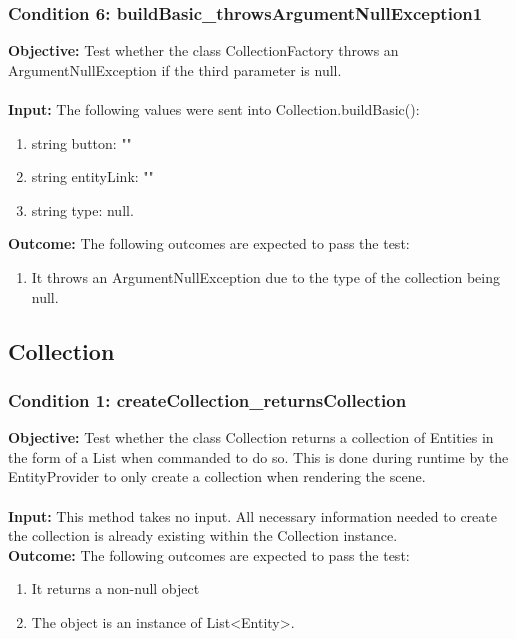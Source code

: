 \documentclass[a4paper,12pt]{article}
\begin{document}
		\subsubsection{Condition 6: buildBasic\_throwsArgumentNullException1}
			\textbf{Objective:} Test whether the class CollectionFactory throws an ArgumentNullException if the third parameter is null.\\\\
			\textbf{Input:} The following values were sent into Collection.buildBasic():
				\begin{enumerate}
					\item string button: ""
					\item string entityLink: ""
					\item string type: null.\\
				\end{enumerate}
			\textbf{Outcome:} The following outcomes are expected to pass the test:
				\begin{enumerate}
					\item It throws an ArgumentNullException due to the type of the collection being null.
				\end{enumerate}
	\subsection{Collection}
		\subsubsection{Condition 1: createCollection\_returnsCollection}
			\textbf{Objective:} Test whether the class Collection returns a collection of Entities in the form of a List when commanded to do so. This is done during runtime by the EntityProvider to only create a collection when rendering the scene.\\\\
			\textbf{Input:} This method takes no input. All necessary information needed to create the collection is already existing within the Collection instance.\\
			\textbf{Outcome:} The following outcomes are expected to pass the test:
				\begin{enumerate}
					\item It returns a non-null object
					\item The object is an instance of List<Entity>.
				\end{enumerate}
\end{document}
